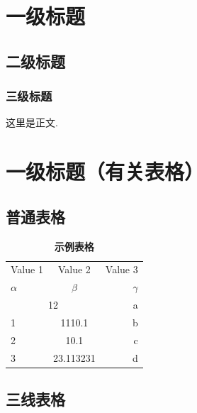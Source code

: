 \documentclass[12pt, a4paper, oneside]{ctexart}
\begin{document}
\newpage
\setcounter{page}{1}

\section{一级标题}

    \subsection{二级标题}

        \subsubsection{三级标题}

这里是正文. 


\section{一级标题（有关表格）}

    \subsection{普通表格}

        \begin{table}[h!]
            \begin{center}
                \caption{\songti {}\bfseries 示例表格}
                \begin{tabular}{l|c|r} %
                \toprule
                \textrm{Value 1} & \textrm{Value 2} & \textrm{Value 3}\\
                $\alpha$ & $\beta$ & $\gamma$ \\
                \hline
                \multicolumn{2}{c|}{12} & a\\ %
                \hline
                1 & 1110.1 & b\\
                2 & 10.1 & c\\
                3 & 23.113231 & d\\
                \bottomrule
                \end{tabular}
            \end{center}
        \end{table}

    \subsection{三线表格}
\end{document}
